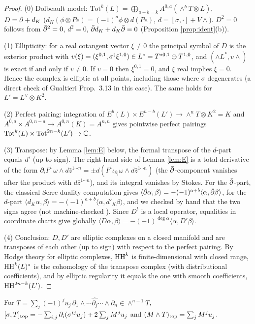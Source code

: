 \begin{proof}
(0) Dolbeault model: $\mathrm{Tot}^k(L)=\bigoplus_{a+b=k}A^{0,a}(\wedge^bT\otimes L)$, $D=\bar\partial+d_K$ ($d_K(\phi\otimes Pe)=(-1)^a\phi\otimes d(Pe)$, $d=[\sigma,\cdot]+V\wedge$). $D^2=0$ follows from $\bar\partial^2=0$, $d^2=0$, $\bar\partial d_K+d_K\bar\partial=0$ (Proposition \ref{prop:ident}(b)).

(1) Ellipticity: for a real cotangent vector $\xi\ne0$ the principal symbol of $D$ is the exterior product with $v(\xi)=(\xi^{0,1},\sigma^\sharp\xi^{1,0})\in L^*=T^{*0,1}\oplus T^{1,0}$, and $(\wedge L^*,v\wedge)$ is exact if and only if $v\ne0$. If $v=0$ then $\xi^{0,1}=0$, and $\xi$ real implies $\xi=0$. Hence the complex is elliptic at all points, including those where $\sigma$ degenerates (a direct check of Gualtieri \cite{Gua11} Prop.~3.13 in this case). The same holds for $L'=L^\vee\otimes K^2$.

(2) Perfect pairing: integration of $E^b(L)\times E^{n-b}(L')\to\wedge^nT\otimes K^2=K$ and $A^{0,a}\times A^{0,n-a}\to A^{0,n}(K)=A^{n,n}$ gives pointwise perfect pairings $\mathrm{Tot}^k(L)\times\mathrm{Tot}^{2n-k}(L')\to\mathbb C$.

(3) Transpose: by Lemma \ref{lem:E} below, the formal transpose of the $d$-part equals $d'$ (up to sign). The right-hand side of Lemma \ref{lem:E} is a total derivative of the form $\partial_iF^i\,\omega\wedge d\bar z^{1\cdots n}=\pm d(F^i\iota_{\partial_i}\omega\wedge d\bar z^{1\cdots n})$ (the $\bar\partial$-component vanishes after the product with $d\bar z^{1\cdots n}$), and its integral vanishes by Stokes. For the $\bar\partial$-part, the classical Serre duality computation gives $\langle\bar\partial\alpha,\beta\rangle=-(-1)^{a+b}\langle\alpha,\bar\partial\beta\rangle$, for the $d$-part $\langle d_K\alpha,\beta\rangle=-(-1)^{a+b}\langle\alpha,d'_K\beta\rangle$, and we checked by hand that the two signs agree (not machine-checked \tQ). Since $D^t$ is a local operator, equalities in coordinate charts give globally $\langle D\alpha,\beta\rangle=-(-1)^{\deg\alpha}\langle\alpha,D'\beta\rangle$.

(4) Conclusion: $D,D'$ are elliptic complexes on a closed manifold and are transposes of each other (up to sign) with respect to the perfect pairing. By Hodge theory for elliptic complexes, $\mathrm{HH}^k$ is finite-dimensional with closed range, $\mathrm{HH}^k(L)^*$ is the cohomology of the transpose complex (with distributional coefficients), and by elliptic regularity it equals the one with smooth coefficients, $\mathrm{HH}^{2n-k}(L')$. \qedhere
\end{proof}
\begin{lem}\tP \tV\label{lem:D}
For $T=\sum_j(-1)^ju_j\,\partial_1\wedge\cdots\widehat{\partial_j}\cdots\wedge\partial_n\in\wedge^{n-1}T$, $[\sigma,T]_{\rm top}=-\sum_{i,j}\partial_i(\sigma^{ij}u_j)+2\sum_jM^ju_j$ and $(M\wedge T)_{\rm top}=\sum_jM^ju_j$.
\end{lem}

